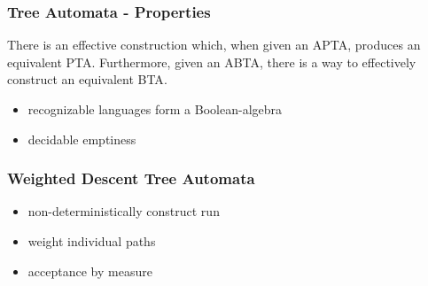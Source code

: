 \documentclass{beamer}
\begin{document}
  \begin{frame}
    \frametitle{Tree Automata - Properties}
    \begin{theorem}
      There is an effective construction which, when given an \ac{APTA},
      produces an equivalent \ac{PTA}. Furthermore, given an \ac{ABTA}, there
      is a way to effectively construct an equivalent \ac{BTA}.
    \end{theorem}
    \begin{itemize}
      \item recognizable languages form a Boolean-algebra
      \item decidable emptiness
    \end{itemize}
  \end{frame}

  \begin{frame}
    \frametitle{Weighted Descent Tree Automata}
    \begin{itemize}
      \item non-deterministically construct run
      \item<2-> weight individual paths
      \item<3-> acceptance by measure
    \end{itemize}
    \begin{overlayarea}{\textwidth}{0.6\textheight}
      \begin{center}
      \end{center}
    \end{overlayarea}
  \end{frame}
\end{document}
